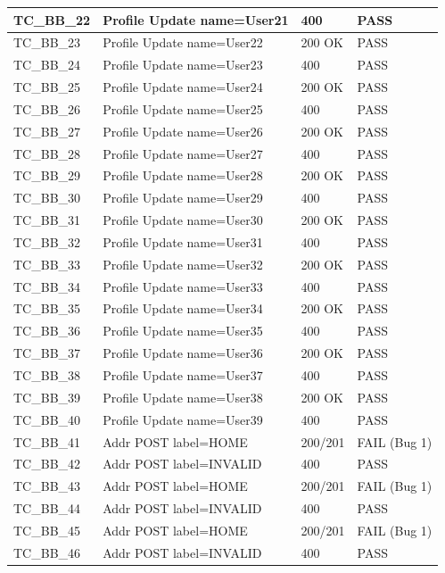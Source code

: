 \documentclass{article}
\begin{document}
\begin{longtable}{|p{2cm}|p{8cm}|p{3cm}|p{2cm}|}
\hline
TC\_BB\_22 & Profile Update name=User21 & 400 & PASS \\
\hline
TC\_BB\_23 & Profile Update name=User22 & 200 OK & PASS \\
\hline
TC\_BB\_24 & Profile Update name=User23 & 400 & PASS \\
\hline
TC\_BB\_25 & Profile Update name=User24 & 200 OK & PASS \\
\hline
TC\_BB\_26 & Profile Update name=User25 & 400 & PASS \\
\hline
TC\_BB\_27 & Profile Update name=User26 & 200 OK & PASS \\
\hline
TC\_BB\_28 & Profile Update name=User27 & 400 & PASS \\
\hline
TC\_BB\_29 & Profile Update name=User28 & 200 OK & PASS \\
\hline
TC\_BB\_30 & Profile Update name=User29 & 400 & PASS \\
\hline
TC\_BB\_31 & Profile Update name=User30 & 200 OK & PASS \\
\hline
TC\_BB\_32 & Profile Update name=User31 & 400 & PASS \\
\hline
TC\_BB\_33 & Profile Update name=User32 & 200 OK & PASS \\
\hline
TC\_BB\_34 & Profile Update name=User33 & 400 & PASS \\
\hline
TC\_BB\_35 & Profile Update name=User34 & 200 OK & PASS \\
\hline
TC\_BB\_36 & Profile Update name=User35 & 400 & PASS \\
\hline
TC\_BB\_37 & Profile Update name=User36 & 200 OK & PASS \\
\hline
TC\_BB\_38 & Profile Update name=User37 & 400 & PASS \\
\hline
TC\_BB\_39 & Profile Update name=User38 & 200 OK & PASS \\
\hline
TC\_BB\_40 & Profile Update name=User39 & 400 & PASS \\
\hline
TC\_BB\_41 & Addr POST label=HOME & 200/201 & FAIL (Bug 1) \\
\hline
TC\_BB\_42 & Addr POST label=INVALID & 400 & PASS \\
\hline
TC\_BB\_43 & Addr POST label=HOME & 200/201 & FAIL (Bug 1) \\
\hline
TC\_BB\_44 & Addr POST label=INVALID & 400 & PASS \\
\hline
TC\_BB\_45 & Addr POST label=HOME & 200/201 & FAIL (Bug 1) \\
\hline
TC\_BB\_46 & Addr POST label=INVALID & 400 & PASS \\

\end{longtable}
\end{document}
